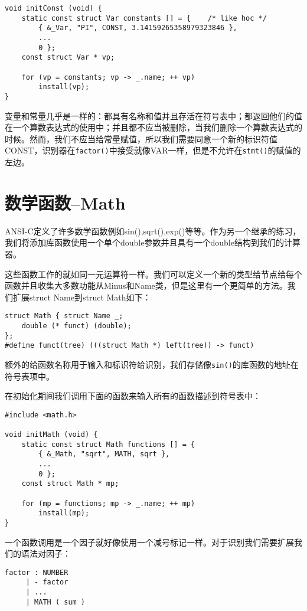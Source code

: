 \begin{lstlisting}
void initConst (void) {
	static const struct Var constants [] = {	/* like hoc */
		{ &_Var, "PI", CONST, 3.14159265358979323846 },
		...
		0 };
	const struct Var * vp;

	for (vp = constants; vp -> _.name; ++ vp)
		install(vp);
}
\end{lstlisting}

变量和常量几乎是一样的：都具有名称和值并且存活在符号表中；都返回他们的值在一个算数表达式的使用中；并且都不应当被删除，当我们删除一个算数表达式的时候。然而，我们不应当给常量赋值，所以我们需要同意一个新的标识符值CONST，识别器在\verb|factor()|中接受就像VAR一样，但是不允许在\verb|stmt()|的赋值的左边。

\section{数学函数--Math}

ANSI-C定义了许多数学函数例如sin(),sqrt(),exp()等等。作为另一个继承的练习，我们将添加库函数使用一个单个double参数并且具有一个double结构到我们的计算器。

这些函数工作的就如同一元运算符一样。我们可以定义一个新的类型给节点给每个函数并且收集大多数功能从Minus和Name类，但是这里有一个更简单的方法。我们扩展struct Name到struct Math如下：

\begin{lstlisting}
struct Math { struct Name _;
	double (* funct) (double);
};
#define funct(tree) (((struct Math *) left(tree)) -> funct)
\end{lstlisting}

额外的给函数名称用于输入和标识符给识别，我们存储像\verb|sin()|的库函数的地址在符号表项中。

在初始化期间我们调用下面的函数来输入所有的函数描述到符号表中：

\begin{lstlisting}
#include <math.h>

void initMath (void) {
	static const struct Math functions [] = {
		{ &_Math, "sqrt", MATH, sqrt },
		...
		0 };
	const struct Math * mp;

	for (mp = functions; mp -> _.name; ++ mp)
		install(mp);
}
\end{lstlisting}

一个函数调用是一个因子就好像使用一个减号标记一样。对于识别我们需要扩展我们的语法对因子：

\begin{lstlisting}
factor : NUMBER
     | - factor
     | ...
     | MATH ( sum )
\end{lstlisting}


